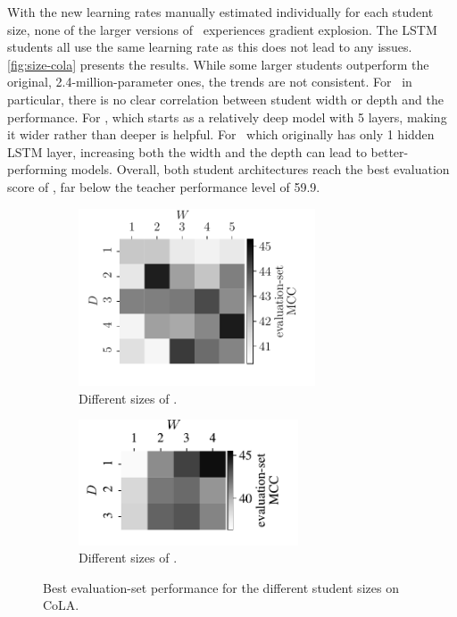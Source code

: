 {{{      With the new learning rates manually estimated individually for each student size, none of the larger versions of \BERTS~experiences gradient explosion. The LSTM students all use the same learning rate as this does not lead to any issues. \autoref{fig:size-cola} presents the results. While some larger students outperform the original, 2.4-million-parameter ones, the trends are not consistent. For \LSTMS~in particular, there is no clear correlation between student width or depth and the performance. For \BERTS, which starts as a relatively deep model with 5 layers, making it wider rather than deeper is helpful. For \LSTMS~which originally has only 1 hidden LSTM layer, increasing both the width and the depth can lead to better-performing models. Overall, both student architectures reach the best evaluation score of , far below the teacher performance level of 59.9. 

      \begin{figure}
        \centering
        \begin{subfigure}{.5\textwidth}
          \centering
          \includegraphics[width=7cm]{../experiments/analysis/img/size-cola-lstm-map}
          \caption{Different sizes of \LSTMS.}
          \label{fig:size-cola-lstm}
        \end{subfigure}%
        \begin{subfigure}{.5\textwidth}
          \centering
          \includegraphics[width=6.5cm]{../experiments/analysis/img/size-cola-bert-map}
          \caption{Different sizes of \BERTS.}
          \label{fig:size-cola-bert}
        \end{subfigure}
        \caption{Best evaluation-set performance for the different student sizes on CoLA.}
        \label{fig:size-cola}
      \end{figure}
      
}}}
